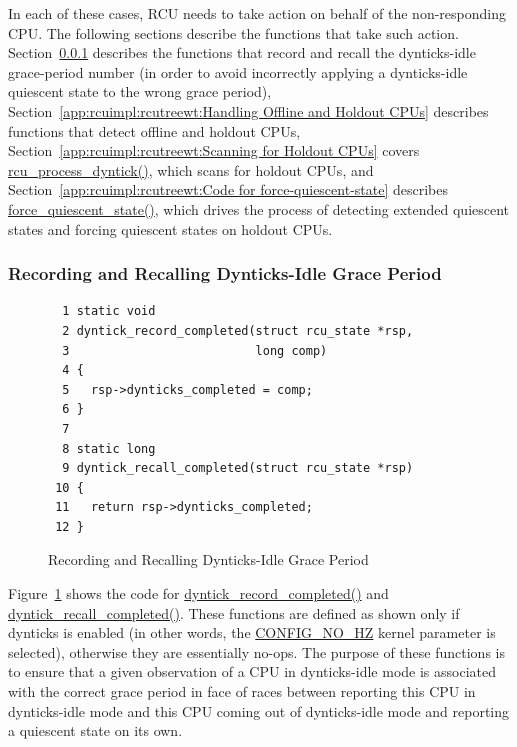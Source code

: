 In each of these cases, RCU needs to take action on behalf of the
non-responding CPU.
The following sections describe the functions that take such action.
Section~\ref{app:rcuimpl:rcutreewt:Recording and Recalling Dynticks-Idle Grace Period}
describes the functions that record and recall the dynticks-idle
grace-period number (in order to avoid incorrectly applying a dynticks-idle
quiescent state to the wrong grace period),
Section~\ref{app:rcuimpl:rcutreewt:Handling Offline and Holdout CPUs}
describes functions that detect offline and holdout CPUs,
Section~\ref{app:rcuimpl:rcutreewt:Scanning for Holdout CPUs}
covers \url{rcu_process_dyntick()}, which scans for holdout CPUs, and
Section~\ref{app:rcuimpl:rcutreewt:Code for force-quiescent-state}
describes \url{force_quiescent_state()}, which drives the process of
detecting extended quiescent states and forcing quiescent states on
holdout CPUs.

\subsubsection{Recording and Recalling Dynticks-Idle Grace Period}
\label{app:rcuimpl:rcutreewt:Recording and Recalling Dynticks-Idle Grace Period}

\begin{figure}[tbp]
{ \scriptsize
\begin{verbatim}
  1 static void
  2 dyntick_record_completed(struct rcu_state *rsp,
  3                          long comp)
  4 {
  5   rsp->dynticks_completed = comp;
  6 }
  7 
  8 static long
  9 dyntick_recall_completed(struct rcu_state *rsp)
 10 {
 11   return rsp->dynticks_completed;
 12 }
\end{verbatim}
}
\caption{Recording and Recalling Dynticks-Idle Grace Period}
\label{fig:app:rcuimpl:rcutreewt:Recording and Recalling Dynticks-Idle Grace Period}
\end{figure}

Figure~\ref{fig:app:rcuimpl:rcutreewt:Recording and Recalling Dynticks-Idle Grace Period}
shows the code for \url{dyntick_record_completed()} and
\url{dyntick_recall_completed()}.
These functions are defined as shown only if dynticks
is enabled (in other words, the \url{CONFIG_NO_HZ} kernel parameter
is selected), otherwise they are essentially no-ops.
The purpose of these functions is to ensure that a given observation
of a CPU in dynticks-idle mode is associated with the correct
grace period in face of races between reporting this CPU in
dynticks-idle mode and this CPU coming out of dynticks-idle mode
and reporting a quiescent state on its own.

